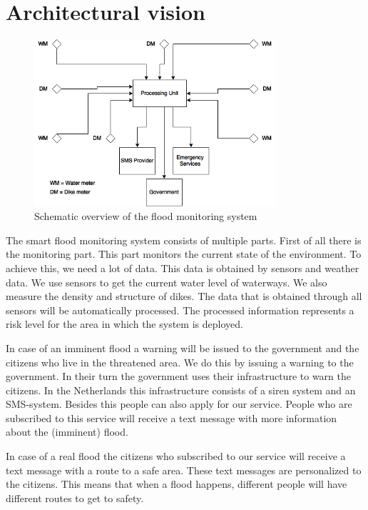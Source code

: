 \section{Architectural vision}

\begin{figure}[h]
\centering
\includegraphics[width=90mm]{images/architecturalVision.png}
\caption{Schematic overview of the flood monitoring system}
\label{fig:architectural-vision}
\end{figure}

The smart flood monitoring system consists of multiple parts. First of all there is the monitoring part. This part monitors the current state of the environment. To achieve this, we need a lot of data. This data is obtained by sensors and weather data. We use sensors to get the current water level of waterways. We also measure the density and structure of dikes. The data that is obtained through all sensors will be automatically processed. The processed information represents a risk level for the area in which the system is deployed.

In case of an imminent flood a warning will be issued to the government and the citizens who live in the threatened area. We do this by issuing a warning to the government. In their turn the government uses their infrastructure to warn the citizens. In the Netherlands this infrastructure consists of a siren system and an SMS-system. Besides this people can also apply for our service. People who are subscribed to this service will receive a text message with more information about the (imminent) flood. 

In case of a real flood the citizens who subscribed to our service will receive a text message with a route to a safe area. These text messages are personalized to the citizens. This means that when a flood happens, different people will have different routes to get to safety.
